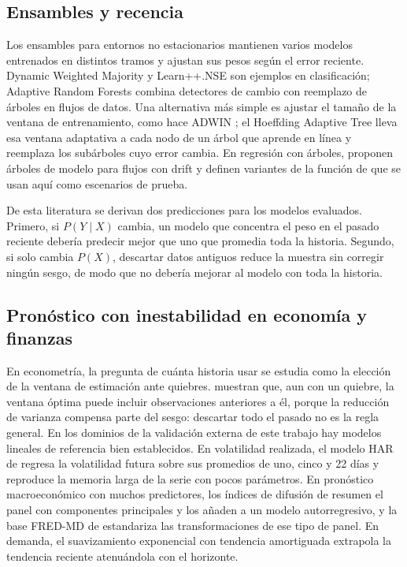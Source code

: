 \documentclass[11pt,a4paper]{article}
\begin{document}
\subsection{Ensambles y recencia}

Los ensambles para entornos no estacionarios mantienen varios modelos entrenados en distintos tramos
y ajustan sus pesos según el error reciente. Dynamic Weighted Majority \parencite{kolter2007} y
Learn++.NSE \parencite{elwell2011} son ejemplos en clasificación; Adaptive Random Forests
\parencite{gomes2017} combina detectores de cambio con reemplazo de árboles en flujos de datos. Una
alternativa más simple es ajustar el tamaño de la ventana de entrenamiento, como hace ADWIN
\parencite{bifet2007}; el Hoeffding Adaptive Tree \parencite{bifet2009} lleva esa ventana adaptativa a
cada nodo de un árbol que aprende en línea y reemplaza los subárboles cuyo error cambia. En regresión con árboles, \textcite{ikonomovska2011} proponen árboles de modelo
para flujos con drift y definen variantes de la función de \textcite{friedman1991} que se usan aquí
como escenarios de prueba.

De esta literatura se derivan dos predicciones para los modelos evaluados. Primero, si $P(Y\mid X)$
cambia, un modelo que concentra el peso en el pasado reciente debería predecir mejor que uno que
promedia toda la historia. Segundo, si solo cambia $P(X)$, descartar datos antiguos reduce la muestra
sin corregir ningún sesgo, de modo que no debería mejorar al modelo con toda la historia.

\subsection{Pronóstico con inestabilidad en economía y finanzas}\label{sec:marco-econ}

En econometría, la pregunta de cuánta historia usar se estudia como la elección de la ventana de
estimación ante quiebres. \textcite{pesaran2007} muestran que, aun con un quiebre, la ventana óptima
puede incluir observaciones anteriores a él, porque la reducción de varianza compensa parte del
sesgo: descartar todo el pasado no es la regla general. En los dominios de la validación externa de
este trabajo hay modelos lineales de referencia bien establecidos. En volatilidad realizada, el modelo
HAR de \textcite{corsi2009} regresa la volatilidad futura sobre sus promedios de uno, cinco y 22 días y
reproduce la memoria larga de la serie con pocos parámetros. En pronóstico macroeconómico con muchos
predictores, los índices de difusión de \textcite{stockwatson2002} resumen el panel con componentes
principales y los añaden a un modelo autorregresivo, y la base FRED-MD de \textcite{mccracken2016}
estandariza las transformaciones de ese tipo de panel. En demanda, el suavizamiento exponencial con
tendencia amortiguada \parencite{gardner1985} extrapola la tendencia reciente atenuándola con el
horizonte.
\end{document}
